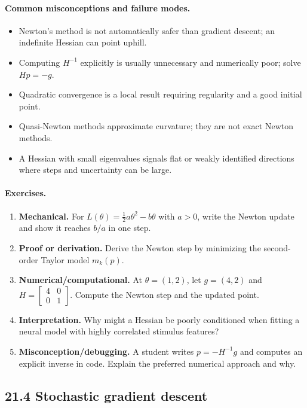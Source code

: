 \paragraph{Common misconceptions and failure modes.}
\begin{itemize}[leftmargin=*]
\item Newton's method is not automatically safer than gradient descent; an indefinite Hessian can point uphill.
\item Computing \(H^{-1}\) explicitly is usually unnecessary and numerically poor; solve \(Hp=-g\).
\item Quadratic convergence is a local result requiring regularity and a good initial point.
\item Quasi-Newton methods approximate curvature; they are not exact Newton methods.
\item A Hessian with small eigenvalues signals flat or weakly identified directions where steps and uncertainty can be large.
\end{itemize}

\paragraph{Exercises.}
\begin{enumerate}[label=\textbf{21.3.\arabic*.}, leftmargin=*]
\item \textbf{Mechanical.} For \(L(\theta)=\frac12 a\theta^2-b\theta\) with \(a>0\), write the Newton update and show it reaches \(b/a\) in one step.
\item \textbf{Proof or derivation.} Derive the Newton step by minimizing the second-order Taylor model \(m_k(p)\).
\item \textbf{Numerical/computational.} At \(\theta=(1,2)\), let \(g=(4,2)\) and \(H=\begin{bmatrix}4&0\\0&1\end{bmatrix}\). Compute the Newton step and the updated point.
\item \textbf{Interpretation.} Why might a Hessian be poorly conditioned when fitting a neural model with highly correlated stimulus features?
\item \textbf{Misconception/debugging.} A student writes \(p=-H^{-1}g\) and computes an explicit inverse in code. Explain the preferred numerical approach and why.
\end{enumerate}

\subsection{21.4 Stochastic gradient descent}

